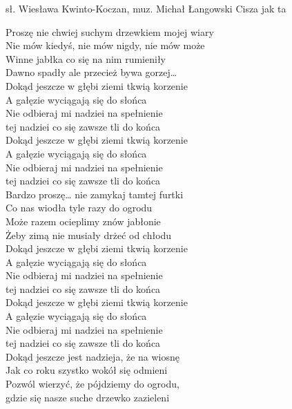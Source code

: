 {sł. Wiesława Kwinto-Koczan, muz. Michał Łangowski}
{Cisza jak ta}
\begin{text}
	\hfill\break
	\hfill\break
	Proszę nie chwiej suchym drzewkiem mojej wiary\\
	Nie mów kiedyś, nie mów nigdy, nie mów może \\
	Winne jabłka co się na nim rumieniły\\
	Dawno spadły ale przecież bywa gorzej…\\

	Dokąd jeszcze w głębi ziemi tkwią korzenie\\
	A gałęzie wyciągają się do słońca\\
	Nie odbieraj mi nadziei na spełnienie\\
	tej nadziei co się zawsze tli do końca\\

	Dokąd jeszcze w głębi ziemi tkwią korzenie\\
	A gałęzie wyciągają się do słońca\\
	Nie odbieraj mi nadziei na spełnienie\\
	tej nadziei co się zawsze tli do końca\\

	Bardzo proszę… nie zamykaj tamtej furtki\\
	Co nas wiodła tyle razy do ogrodu\\
	Może razem ocieplimy znów jabłonie\\
	Żeby zimą nie musiały drżeć od chłodu\\

	Dokąd jeszcze w głębi ziemi tkwią korzenie\\
	A gałęzie wyciągają się do słońca\\
	Nie odbieraj mi nadziei na spełnienie\\
	tej nadziei co się zawsze tli do końca\\

	Dokąd jeszcze w głębi ziemi tkwią korzenie\\
	A gałęzie wyciągają się do słońca\\
	Nie odbieraj mi nadziei na spełnienie\\
	tej nadziei co się zawsze tli do końca\\

	Dokąd jeszcze jest nadzieja, że na wiosnę\\
	Jak co roku szystko wokół się odmieni\\
	Pozwól wierzyć, że pójdziemy do ogrodu,\\
	gdzie się nasze suche drzewko zazieleni\\
\end{text}
